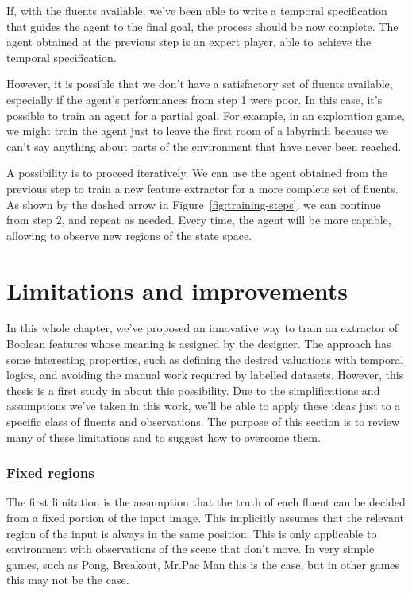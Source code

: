 If, with the fluents available, we've been able to write a temporal
specification that guides the agent to the final goal, the process should be
now complete. The agent obtained at the previous step is an expert player,
able to achieve the temporal specification.

However, it is possible that we don't have a satisfactory set of fluents
available, especially if the agent's performances from step 1 were poor.
In this case, it's possible to train an agent for a partial goal. For example,
in an exploration game, we might train the agent just to leave the first room
of a labyrinth because we can't say anything about parts of the environment
that have never been reached.

A possibility is to proceed iteratively. We can use the agent obtained from
the previous step to train a new feature extractor for a more complete set of
fluents. As shown by the dashed arrow in Figure~\ref{fig:training-steps}, we
can continue from step 2, and repeat as needed. Every time, the agent will be
more capable, allowing to observe new regions of the state space.


\section{Limitations and improvements}

\label{sec:fluents-limitations}

In this whole chapter, we've proposed an innovative way to train an extractor
of Boolean features whose meaning is assigned by the designer. The approach
has some interesting properties, such as defining the desired valuations with
temporal logics, and avoiding the manual work required by labelled datasets.
However, this thesis is a first study in about this possibility. Due to the
simplifications and assumptions we've taken in this work, we'll be able to
apply these ideas just to a specific class of fluents and observations. The
purpose of this section is to review many of these limitations and to suggest
how to overcome them.

\subsubsection*{Fixed regions}

The first limitation is the assumption that the truth of each fluent can be
decided from a fixed portion of the input image. This implicitly assumes that
the relevant region of the input is always in the same position. This is only
applicable to environment with observations of the scene that don't move. In
very simple games, such as Pong, Breakout, Mr.Pac Man this is the case, but in
other games this may not be the case.

